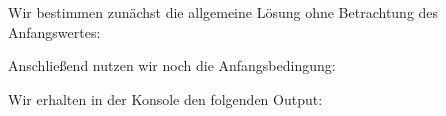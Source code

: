\section{}

Wir bestimmen zunächst die allgemeine Lösung ohne Betrachtung des Anfangswertes:



Anschließend nutzen wir noch die Anfangsbedingung:



Wir erhalten in der Konsole den folgenden Output:

